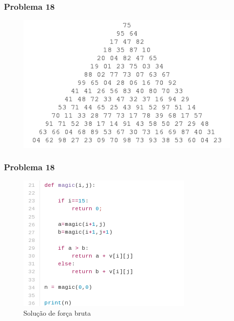 \documentclass{beamer}
\begin{document}
\begin{frame}
    \frametitle{Problema 18}
    \begin{figure}[htpb]
        \centering
        \includegraphics[width=0.8\linewidth]{images/p18_2.png}
    \end{figure}
\end{frame}

\begin{frame}
    \frametitle{Problema 18}
    \begin{figure}[htpb]
        \centering
        \includegraphics[width=0.5\linewidth]{images/prob18.png}
        \caption{Solução de força bruta}
    \end{figure}
\end{frame}
\end{document}
